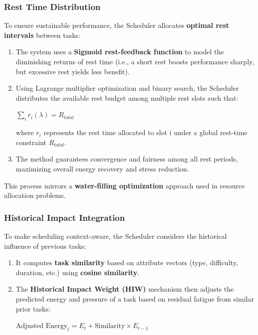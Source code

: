 \documentclass[12pt, a4paper]{article}
\begin{document}
        \subsubsection{Rest Time Distribution}

            To ensure sustainable performance, the Scheduler allocates \textbf{optimal rest intervals} between tasks: 

            \begin{enumerate}
                \item The system uses a \textbf{Sigmoid rest-feedback function} to model the diminishing returns of rest time (i.e., a short rest boosts performance sharply, but excessive rest yields less benefit).
                
                \item Using Lagrange multiplier optimization and binary search, the Scheduler distributes the available rest budget among multiple rest slots such that: 

                    \begin{center}
                        $\sum_i r_i (\lambda) = R_{total}$
                    \end{center}
    
                    where $r_i$ represents the rest time allocated to slot i under a global rest-time constraint $R_{total}$.

                \item The method guarantees convergence and fairness among all rest periods, maximizing overall energy recovery and stress reduction.
            \end{enumerate}

            This process mirrors a \textbf{water-filling optimization} approach used in resource allocation problems.

        \subsubsection{Historical Impact Integration}

            To make scheduling context-aware, the Scheduler considers the historical influence of previous tasks:

            \begin{enumerate}
                \item It computes \textbf{task similarity} based on attribute vectors (type, difficulty, duration, etc.) using \textbf{cosine similarity}.
                \item The \textbf{Historical Impact Weight (HIW)} mechanism then adjusts the predicted energy and pressure of a task based on residual fatigue from similar prior tasks:

                \begin{center}
                    $\text{Adjusted\ Energy}_t = E_t + \text{Similarity} \times E_{t-1}$
                \end{center}
            \end{enumerate}
\end{document}
